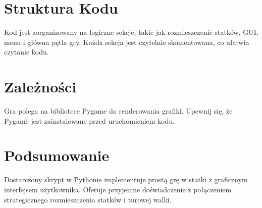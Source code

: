 \documentclass[12pt]{article}
\begin{document}
\section{Struktura Kodu}
Kod jest zorganizowany na logiczne sekcje, takie jak rozmieszczenie statków, GUI, menu i główna pętla gry. Każda sekcja jest czytelnie skomentowana, co ułatwia czytanie kodu.

\section{Zależności}
Gra polega na bibliotece Pygame do renderowania grafiki. Upewnij się, że Pygame jest zainstalowane przed uruchomieniem kodu.

\section{Podsumowanie}
Dostarczony skrypt w Pythonie implementuje prostą grę w statki z graficznym interfejsem użytkownika. Oferuje przyjemne doświadczenie z połączeniem strategicznego rozmieszczenia statków i turowej walki.
\end{document}
